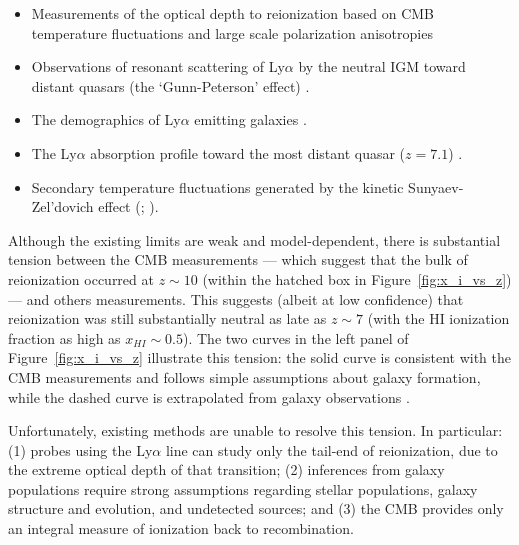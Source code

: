 \documentclass[preprint]{aastex}
\newcommand{\Mycitep}[1]{{\bf \citep{#1}}}
\newcommand{\Mycitealt}[1]{{\bf \citealt{#1}}}
\begin{document}
\begin{itemize}[noitemsep,nolistsep]

\item Measurements of the optical depth to reionization based on CMB temperature fluctuations \citep{planck_et_al2013}
and large scale polarization anisotropies \citep{page_et_al2007}

\item Observations of resonant scattering of Ly$\alpha$ by the neutral IGM toward
distant quasars (the `Gunn-Peterson' effect) \citep{fan_et_al2006}.

\item The demographics of Ly$\alpha$ emitting  galaxies \citep{schenker_et_al2013, treu_et_al2013,Faisst_et_al2014}.

\item The Ly$\alpha$ absorption profile toward the most distant quasar ($z = 7.1$) \citep{bolton_et_al2011}.

\item Secondary temperature fluctuations generated by the kinetic Sunyaev-Zel'dovich effect (\citealt{zahn_et_al2012}; \Mycitealt{mesinger_et_al2012}). 
\end{itemize} 
\noindent 
Although the existing limits are weak and
model-dependent, there is substantial tension between the CMB measurements ---
which suggest that the bulk of reionization occurred at $z \sim 10$ (within the
hatched box in Figure~\ref{fig:x_i_vs_z}) --- and others measurements.  This
suggests (albeit at low confidence) that reionization was still substantially
neutral as late as $z \sim 7$ (with the  HI ionization fraction as high as
$x_{HI} \sim 0.5$).  The two curves in the left panel of
Figure~\ref{fig:x_i_vs_z} illustrate this tension: the solid curve is
consistent with the CMB measurements and follows simple assumptions about
galaxy formation, while the dashed curve is extrapolated from galaxy
observations \Mycitep{robertson_2013}. 

Unfortunately, existing methods are unable to resolve this tension. In particular:
(1) probes using the Ly$\alpha$ line can study only the tail-end of reionization, 
due to the extreme optical depth of that transition; (2) inferences from galaxy populations require strong assumptions 
regarding stellar populations, galaxy structure and evolution, and undetected sources; and (3) the CMB provides only an integral measure of ionization back to recombination. 
\end{document}
